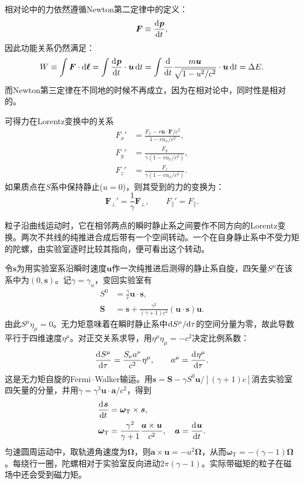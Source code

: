 相对论中的力依然遵循Newton第二定律中的定义：
\[
    \bm F \equiv \frac{\mathop{}\!\mathrm{d}^{}\bm p}{\mathrm{d}{t}^{}},
\]
因此功能关系仍然满足：
\begin{equation}
    W \equiv \int\bm F \cdot \mathop{}\!\mathrm{d}\bm\ell = \int\frac{\mathop{}\!\mathrm{d}^{}\bm p}{\mathrm{d}{t}^{}} \cdot \bm u\mathop{}\!\mathrm{d} t = \int\frac{\mathop{}\!\mathrm{d}^{}}{\mathrm{d}{t}^{}}\frac{m\bm u}{\sqrt{1 - u^2/c^2}} \cdot \bm u\mathop{}\!\mathrm{d} t = \Delta E.
\end{equation}
而Newton第三定律在不同地的时候不再成立，因为在相对论中，同时性是相对的。

可得力在Lorentz变换中的关系
\begin{subequations}
    \begin{align}
        F_x' &= \frac{F_x - v\bm u \cdot \bm F/c^2}{1 - vu_x/c^2},\\
        F_y' &= \frac{F_y}{\gamma(1 - vu_x/c^2)},\\
        F_z' &= \frac{F_z}{\gamma(1 - vu_x/c^2)}.
    \end{align}
\end{subequations}
如果质点在$S$系中保持静止($u = 0$)，则其受到的力的变换为：
\begin{equation}
    \bm F_\perp' = \frac1\gamma\bm F_\perp,\qquad F_\parallel' = F_\parallel.
\end{equation}

粒子沿曲线运动时，它在相邻两点的瞬时静止系之间要作不同方向的Lorentz变换。两次不共线的纯推进合成后带有一个空间转动。一个在自身静止系中不受力矩的陀螺，由实验室逐时比较其指向，便可看出这个转动。

令$\bm s$为用实验室系沿瞬时速度$\bm u$作一次纯推进后测得的静止系自旋，四矢量$S^\mu$在该系中为$(0,\bm s)$。记$\gamma = \gamma_u$，变回实验室有
\begin{align*}
    S^0 &= \frac{\gamma}{c}\bm u \cdot \bm s,\\
    \bm S &= \bm s + \frac{\gamma^2}{(\gamma + 1)c^2}(\bm u \cdot \bm s)\bm u.
\end{align*}
由此$S^\mu\eta_\mu = 0$。无力矩意味着在瞬时静止系中$\mathop{}\!\mathrm{d} S^\mu/\mathrm{d}\tau$的空间分量为零，故此导数平行于四维速度$\eta^\mu$。对正交关系求导，用$\eta^\mu\eta_\mu = -c^2$决定比例系数：
\begin{equation}
    \label{eq:ed-fermi-walker-transport}
    \frac{\mathop{}\!\mathrm{d}^{}S^\mu}{\mathrm{d}{\tau}^{}} = \frac{S_\nu a^\nu}{c^2}\eta^\mu,\qquad a^\mu = \frac{\mathop{}\!\mathrm{d}^{}\eta^\mu}{\mathrm{d}{\tau}^{}}.
\end{equation}
这是无力矩自旋的Fermi--Walker输运。用$\bm s = \bm S - \gamma S^0\bm u/[(\gamma + 1)c]$消去实验室四矢量的分量，并用$\dot\gamma = \gamma^3\bm u \cdot \bm a/c^2$，得到
\begin{subequations}
    \begin{align}
        \frac{\mathop{}\!\mathrm{d}^{}\bm s}{\mathrm{d}{t}^{}} &= \bm\omega_\mathrm{T} \times \bm s,\\
        \bm\omega_\mathrm{T} &= \frac{\gamma^2}{\gamma + 1}\frac{\bm a \times \bm u}{c^2},
        \quad \bm a = \frac{\mathop{}\!\mathrm{d}^{}\bm u}{\mathrm{d}{t}^{}} .
    \end{align}
\end{subequations}
匀速圆周运动中，取轨道角速度为$\bm\Omega$，则$\bm a \times \bm u = -u^2\bm\Omega$，从而$\bm\omega_\mathrm{T} = -(\gamma - 1)\bm\Omega$。每绕行一圈，陀螺相对于实验室反向进动$2\pi(\gamma - 1)$。实际带磁矩的粒子在磁场中还会受到磁力矩。

